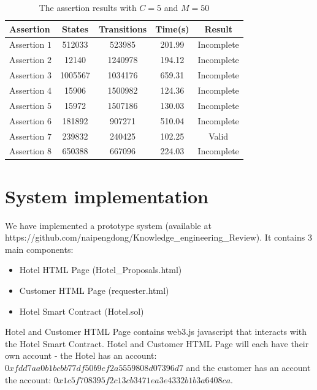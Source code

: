 \documentclass{KERauth}
\begin{document}
\begin{table}[h]
    \centering
    \begin{tabular}{l|c|c|c|c}
    \hline
      Assertion &States &Transitions& Time(s) &Result\\
      \hline
Assertion $1$ & 512033 & 523985 & 201.99 & Incomplete\\
Assertion $2$ & 12140 & 1240978 & 194.12 & Incomplete\\
Assertion $3$ & 1005567 & 1034176 & 659.31 & Incomplete\\
Assertion $4$ & 15906 & 1500982 & 124.36 & Incomplete\\
Assertion $5$ & 15972  & 1507186 & 130.03 & Incomplete\\
Assertion $6$ & 181892  & 907271 & 510.04 & Incomplete\\
Assertion $7$ & 239832 & 240425 & 102.25 & Valid\\
Assertion $8$ & 650388 & 667096 & 224.03 & Incomplete\\
\hline
    \end{tabular}
    \caption{The assertion results with $C = 5$ and $M = 50$}
    \label{tab:verif_2}
\end{table}


\section{System implementation}

We have implemented a prototype system (available at https://github.com/naipengdong/Knowledge\_engineering\_Review). 
It contains $3$ main components: 
\begin{itemize}
    \item Hotel HTML Page (Hotel\_Proposals.html)
    \item 	Customer HTML Page (requester.html)
    \item Hotel Smart Contract (Hotel.sol)
\end{itemize}
Hotel and Customer HTML Page contains web3.js javascript that interacts with the Hotel Smart Contract. Hotel and Customer HTML Page will each have their own account - the Hotel has an account: $0xfdd7aa0b1bcbb77df50b9ef2a5559808d07396d7$ and the customer has an account the account: $0x1c5f708395f2c13cb3471ea3e4332b1b3a6408ca$. 

\end{document}
